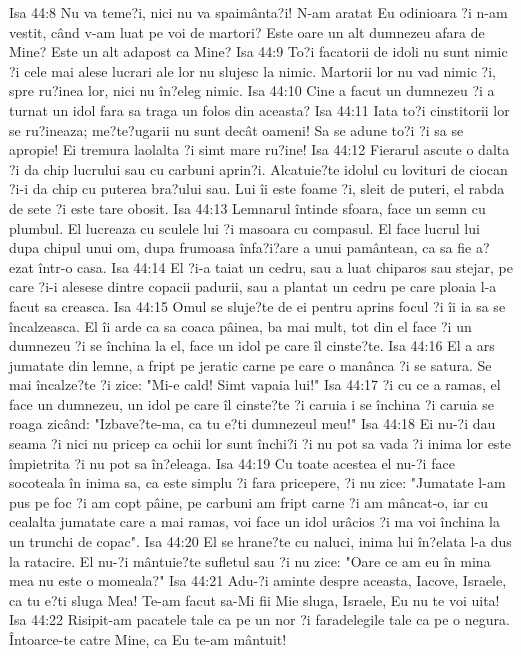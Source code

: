 Isa 44:8  Nu va teme?i, nici nu va spaimânta?i! N-am aratat Eu odinioara ?i n-am vestit, când v-am luat pe voi de martori? Este oare un alt dumnezeu afara de Mine? Este un alt adapost ca Mine?
Isa 44:9  To?i facatorii de idoli nu sunt nimic ?i cele mai alese lucrari ale lor nu slujesc la nimic. Martorii lor nu vad nimic ?i, spre ru?inea lor, nici nu în?eleg nimic.
Isa 44:10  Cine a facut un dumnezeu ?i a turnat un idol fara sa traga un folos din aceasta?
Isa 44:11  Iata to?i cinstitorii lor se ru?ineaza; me?te?ugarii nu sunt decât oameni! Sa se adune to?i ?i sa se apropie! Ei tremura laolalta ?i simt mare ru?ine!
Isa 44:12  Fierarul ascute o dalta ?i da chip lucrului sau cu carbuni aprin?i. Alcatuie?te idolul cu lovituri de ciocan ?i-i da chip cu puterea bra?ului sau. Lui îi este foame ?i, sleit de puteri, el rabda de sete ?i este tare obosit.
Isa 44:13  Lemnarul întinde sfoara, face un semn cu plumbul. El lucreaza cu sculele lui ?i masoara cu compasul. El face lucrul lui dupa chipul unui om, dupa frumoasa înfa?i?are a unui pamântean, ca sa fie a?ezat într-o casa.
Isa 44:14  El ?i-a taiat un cedru, sau a luat chiparos sau stejar, pe care ?i-i alesese dintre copacii padurii, sau a plantat un cedru pe care ploaia l-a facut sa creasca.
Isa 44:15  Omul se sluje?te de ei pentru aprins focul ?i îi ia sa se încalzeasca. El îi arde ca sa coaca pâinea, ba mai mult, tot din el face ?i un dumnezeu ?i se închina la el, face un idol pe care îl cinste?te.
Isa 44:16  El a ars jumatate din lemne, a fript pe jeratic carne pe care o manânca ?i se satura. Se mai încalze?te ?i zice: "Mi-e cald! Simt vapaia lui!"
Isa 44:17  ?i cu ce a ramas, el face un dumnezeu, un idol pe care îl cinste?te ?i caruia i se închina ?i caruia se roaga zicând: "Izbave?te-ma, ca tu e?ti dumnezeul meu!"
Isa 44:18  Ei nu-?i dau seama ?i nici nu pricep ca ochii lor sunt închi?i ?i nu pot sa vada ?i inima lor este împietrita ?i nu pot sa în?eleaga.
Isa 44:19  Cu toate acestea el nu-?i face socoteala în inima sa, ca este simplu ?i fara pricepere, ?i nu zice: "Jumatate l-am pus pe foc ?i am copt pâine, pe carbuni am fript carne ?i am mâncat-o, iar cu cealalta jumatate care a mai ramas, voi face un idol urâcios ?i ma voi închina la un trunchi de copac".
Isa 44:20  El se hrane?te cu naluci, inima lui în?elata l-a dus la ratacire. El nu-?i mântuie?te sufletul sau ?i nu zice: "Oare ce am eu în mina mea nu este o momeala?"
Isa 44:21  Adu-?i aminte despre aceasta, Iacove, Israele, ca tu e?ti sluga Mea! Te-am facut sa-Mi fii Mie sluga, Israele, Eu nu te voi uita!
Isa 44:22  Risipit-am pacatele tale ca pe un nor ?i faradelegile tale ca pe o negura. Întoarce-te catre Mine, ca Eu te-am mântuit!
